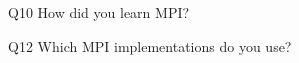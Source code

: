 \begin{description}%
\item{Q10} How did you learn MPI?%
\item{Q12} Which MPI implementations do you use?%
\end{description}%
